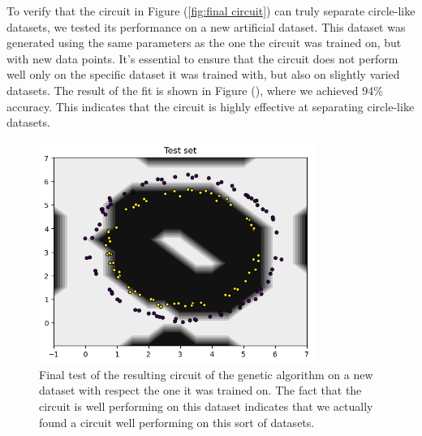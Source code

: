 \documentclass[12pt]{article}
\begin{document}
To verify that the circuit in Figure (\ref{fig:final circuit}) can truly separate circle-like datasets, we tested its performance on a new artificial dataset. This dataset was generated using the same parameters as the one the circuit was trained on, but with new data points. It's essential to ensure that the circuit does not perform well only on the specific dataset it was trained with, but also on slightly varied datasets. The result of the fit is shown in Figure (), where we achieved 94\% accuracy. This indicates that the circuit is highly effective at separating circle-like datasets.
\begin{figure}[h!]
    \centering
    \includegraphics[width=0.8\textwidth]{images/awesomeresult.png}
    \caption{Final test of the resulting circuit of the genetic algorithm on a new dataset with respect the one it was trained on. The fact that the circuit is well performing on this dataset indicates that we actually found a circuit well performing on this sort of datasets.}
    \label{fig:awesome}
\end{figure}
\end{document}

